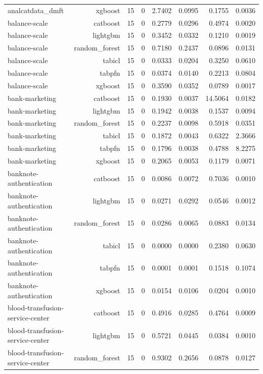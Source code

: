 \begin{table}[htbp]
\begin{tabular}{lrrrrrrr}
analcatdata\_dmft & xgboost & 15 & 0 & 2.7402 & 0.0995 & 0.1755 & 0.0036 \\
balance-scale & catboost & 15 & 0 & 0.2779 & 0.0296 & 0.4974 & 0.0020 \\
balance-scale & lightgbm & 15 & 0 & 0.3452 & 0.0332 & 0.1210 & 0.0019 \\
balance-scale & random\_forest & 15 & 0 & 0.7180 & 0.2437 & 0.0896 & 0.0131 \\
balance-scale & tabicl & 15 & 0 & 0.0333 & 0.0204 & 0.3250 & 0.0610 \\
balance-scale & tabpfn & 15 & 0 & 0.0374 & 0.0140 & 0.2213 & 0.0804 \\
balance-scale & xgboost & 15 & 0 & 0.3590 & 0.0352 & 0.0789 & 0.0017 \\
bank-marketing & catboost & 15 & 0 & 0.1930 & 0.0037 & 14.5064 & 0.0182 \\
bank-marketing & lightgbm & 15 & 0 & 0.1942 & 0.0038 & 0.1537 & 0.0094 \\
bank-marketing & random\_forest & 15 & 0 & 0.2237 & 0.0098 & 0.5918 & 0.0351 \\
bank-marketing & tabicl & 15 & 0 & 0.1872 & 0.0043 & 0.6322 & 2.3666 \\
bank-marketing & tabpfn & 15 & 0 & 0.1796 & 0.0038 & 0.4788 & 8.2275 \\
bank-marketing & xgboost & 15 & 0 & 0.2065 & 0.0053 & 0.1179 & 0.0071 \\
banknote-authentication & catboost & 15 & 0 & 0.0086 & 0.0072 & 0.7036 & 0.0010 \\
banknote-authentication & lightgbm & 15 & 0 & 0.0271 & 0.0292 & 0.0546 & 0.0012 \\
banknote-authentication & random\_forest & 15 & 0 & 0.0286 & 0.0065 & 0.0883 & 0.0134 \\
banknote-authentication & tabicl & 15 & 0 & 0.0000 & 0.0000 & 0.2380 & 0.0630 \\
banknote-authentication & tabpfn & 15 & 0 & 0.0001 & 0.0001 & 0.1518 & 0.1074 \\
banknote-authentication & xgboost & 15 & 0 & 0.0154 & 0.0106 & 0.0204 & 0.0010 \\
blood-transfusion-service-center & catboost & 15 & 0 & 0.4916 & 0.0285 & 0.4764 & 0.0009 \\
blood-transfusion-service-center & lightgbm & 15 & 0 & 0.5721 & 0.0445 & 0.0384 & 0.0010 \\
blood-transfusion-service-center & random\_forest & 15 & 0 & 0.9302 & 0.2656 & 0.0878 & 0.0127 \\

\end{tabular}
\end{table}
